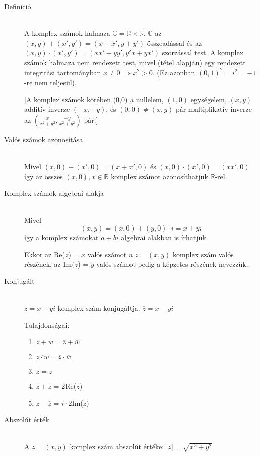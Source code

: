\documentclass[margin=0px]{article}
\newcommand{\R}{\mathbb{R}}
\newcommand{\C}{\mathbb{C}}
\begin{document}
\begin{description}
    \item[Definíció] \hfill \\
        A komplex számok halmaza $\C = \R \times \R$. $\C$ az $(x,y)+(x',y') = (x+x', y+y')$ összeadással és az $(x,y)\cdot(x',y') = (xx'-yy', y'x+yx')$ szorzással test. A komplex számok halmaza nem rendezett test, mivel (tétel alapján) egy rendezett integritási tartományban $ x \neq 0 \ \Rightarrow x^2 > 0$. (Ez azonban $(0,1)^2=i^2 = -1$-re nem teljesül).

            [A komplex számok körében (0,0) a nullelem, $(1,0)$ egységelem, $(x,y)$ additív inverze $(-x,-y)$, és $(0,0) \neq (x,y)$ pár multiplikatív inverze az $(\frac{x}{x^2+y^2}, \frac{-y}{x^2+y^2})$ pár.]
    \item[Valós számok azonosítása] \hfill \\
        Mivel $(x,0)+(x',0) = (x+x',0)$ és $(x,0)\cdot(x',0) = (xx',0)$ így az összes $(x,0), x\in\R$ komplex számot azonosíthatjuk $\R$-rel.
    \item[Komplex számok algebrai alakja] \hfill \\
        Mivel
        \[(x,y) = (x,0)+(y,0)\cdot i = x+yi\]
        így a komplex számokat $a+bi$ algebrai alakban is írhatjuk.

        Ekkor az Re($z$) = $x$ valós számot a $z = (x,y)$ komplex szám valós részének, az Im($z$) = $y$ valós számot pedig a képzetes  részének nevezzük.
    \item[Konjugált] \hfill \\
        $ z = x+yi$ komplex szám konjugáltja: $\overline{z} = x-yi$

        Tulajdonságai:
        \begin{enumerate}
            \item $\overline{z+w} = \overline{z}+\overline{w}$
            \item $\overline{z\cdot w} = \overline{z}\cdot\overline{w}$
            \item $\overline{\overline{z}} = z$
            \item $z + \overline{z}$ = 2Re($z$)
            \item $z - \overline{z}$ = $i\cdot2$Im($z$)
        \end{enumerate}
    \item[Abszolút érték] \hfill \\
        A $z=(x,y)$ komplex szám abszolút értéke: $|z| = \sqrt{x^2+y^2}$


\end{description}
\end{document}
